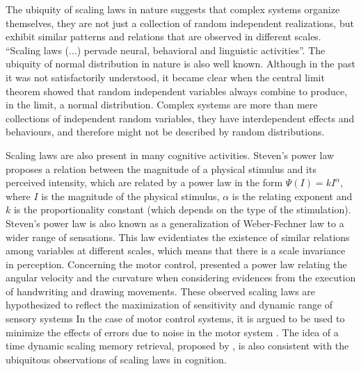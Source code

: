 The ubiquity of scaling laws in nature suggests that complex systems organize themselves,
they are not just a collection of random independent realizations, but exhibit similar patterns
and relations that are observed in different scales. ``Scaling laws (...) pervade neural,
behavioral and linguistic activities''\citep{kello2010}. The ubiquity of normal distribution in 
nature is also well known. Although in the past it was not satisfactorily understood, it became clear
when the central limit theorem showed that random independent variables always combine to
produce, in the limit, a normal distribution. Complex systems are more than mere collections
of independent random variables, they have interdependent effects and behaviours, and therefore
might not be described by random distributions.

Scaling laws are also present in many cognitive activities. 
Steven's power law \citep{stevens1957} proposes a relation
between the magnitude of a physical stimulus and its perceived intensity, which are related 
by a power law in the form $\Psi(I) = k I^\alpha$, where $I$ is the magnitude of the physical
stimulus, $\alpha$ is the relating exponent and $k$ is the proportionality constant (which depends
on the type of the stimulation). Steven's power law is also known as a 
generalization of Weber-Fechner law to a wider range of sensations.
This law evidentiates the existence of similar relations among variables at different
scales, which means that there is a scale invariance in perception.
Concerning the motor control, \cite{lacquaniti1983} presented a power law relating 
the angular velocity and the curvature when considering evidences from the execution
of handwriting and drawing movements. These observed scaling laws are hypothesized 
to reflect the maximization of sensitivity and dynamic range of sensory systems \citep{copelli2007}
In the case of motor control systems, it is argued to be used to minimize the effects
of errors due to noise in the motor system \citep{harris1988}. The idea of a time dynamic scaling
memory retrieval, proposed by \cite{gordon2007}, is also consistent with the ubiquitous 
observations of scaling laws in cognition.

